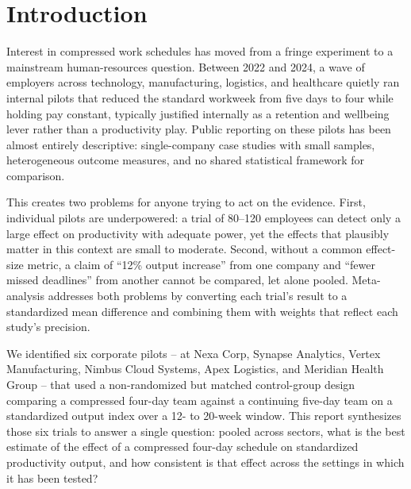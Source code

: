 \section{Introduction}

Interest in compressed work schedules has moved from a fringe experiment to a mainstream
human-resources question. Between 2022 and 2024, a wave of employers across technology,
manufacturing, logistics, and healthcare quietly ran internal pilots that reduced the
standard workweek from five days to four while holding pay constant, typically justified
internally as a retention and wellbeing lever rather than a productivity play. Public
reporting on these pilots has been almost entirely descriptive: single-company case studies
with small samples, heterogeneous outcome measures, and no shared statistical framework
for comparison.

This creates two problems for anyone trying to act on the evidence. First, individual
pilots are underpowered: a trial of 80--120 employees can detect only a large effect on
productivity with adequate power, yet the effects that plausibly matter in this context are
small to moderate. Second, without a common effect-size metric, a claim of ``12\% output
increase'' from one company and ``fewer missed deadlines'' from another cannot be compared,
let alone pooled. Meta-analysis addresses both problems by converting each trial's result to
a standardized mean difference and combining them with weights that reflect each study's
precision.

We identified six corporate pilots -- at Nexa Corp, Synapse Analytics, Vertex Manufacturing,
Nimbus Cloud Systems, Apex Logistics, and Meridian Health Group -- that used a
non-randomized but matched control-group design comparing a compressed four-day team against
a continuing five-day team on a standardized output index over a 12- to 20-week window. This
report synthesizes those six trials to answer a single question: pooled across sectors, what
is the best estimate of the effect of a compressed four-day schedule on standardized
productivity output, and how consistent is that effect across the settings in which it has
been tested?
